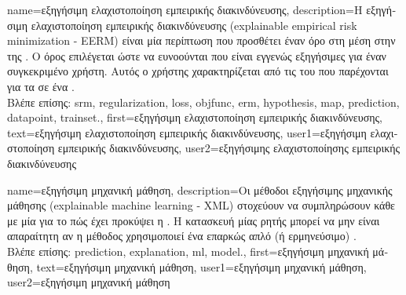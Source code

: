 {name={\foreignlanguage{greek}{εξηγήσιμη ελαχιστοποίηση εμπειρικής διακινδύνευσης}}, 
	description={\foreignlanguage{greek}{Η εξηγήσιμη ελαχιστοποίηση εμπειρικής διακινδύνευσης} 
		(explainable empirical risk minimization - EERM) 
		\foreignlanguage{greek}{είναι μία περίπτωση}  \foreignlanguage{greek}{που προσθέτει έναν όρο} 
		 \foreignlanguage{greek}{στη μέση}  \foreignlanguage{greek}{στην}  
		\foreignlanguage{greek}{της} . \foreignlanguage{greek}{Ο όρος}  
		\foreignlanguage{greek}{επιλέγεται ώστε να ευνοούνται} 
		 \foreignlanguage{greek}{που είναι εγγενώς εξηγήσιμες για έναν συγκεκριμένο χρήστη. Αυτός ο 
		χρήστης χαρακτηρίζεται από τις}  \foreignlanguage{greek}{του που παρέχονται για τα}  
		 \foreignlanguage{greek}{σε ένα}  \cite{Zhang:2024aa}.
		\\
		\foreignlanguage{greek}{Βλέπε επίσης:} \gls{srm}, \gls{regularization}, \gls{loss}, \gls{objfunc}, \gls{erm}, \gls{hypothesis}, 
		\gls{map}, \gls{prediction}, \gls{datapoint}, \gls{trainset}.},
	first={\foreignlanguage{greek}{εξηγήσιμη ελαχιστοποίηση εμπειρικής διακινδύνευσης}}, 
	text={\foreignlanguage{greek}{εξηγήσιμη ελαχιστοποίηση εμπειρικής διακινδύνευσης}},
	user1={\foreignlanguage{greek}{εξηγήσιμη ελαχιστοποίηση εμπειρικής διακινδύνευσης}}, %
  	user2={\foreignlanguage{greek}{εξηγήσιμης ελαχιστοποίησης εμπειρικής διακινδύνευσης}} %
}

{name={\foreignlanguage{greek}{εξηγήσιμη μηχανική μάθηση}}, 
	description={\foreignlanguage{greek}{Οι μέθοδοι εξηγήσιμης μηχανικής 
		μάθησης} (explainable machine learning - XML)
		\foreignlanguage{greek}{στοχεύουν να συμπληρώσουν κάθε}  \foreignlanguage{greek}{με μία} 
		 \foreignlanguage{greek}{για το πώς έχει προκύψει η} . 
		\foreignlanguage{greek}{Η κατασκευή μίας ρητής}  \foreignlanguage{greek}{μπορεί να 
		μην είναι απαραίτητη αν η μέθοδος}  \foreignlanguage{greek}{χρησιμοποιεί ένα επαρκώς απλό 
		(ή ερμηνεύ\-σιμο})  \cite{rudin2019stop}.
		\\
		\foreignlanguage{greek}{Βλέπε επίσης:} \gls{prediction}, \gls{explanation}, \gls{ml}, \gls{model}.},
	first={\foreignlanguage{greek}{εξηγήσιμη μηχανική μάθηση}},
	text={\foreignlanguage{greek}{εξηγήσιμη μηχανική μάθηση}},
	user1={\foreignlanguage{greek}{εξηγήσιμη μηχανική μάθηση}}, %
  	user2={\foreignlanguage{greek}{εξηγήσιμη μηχανική μάθηση}} %
}


